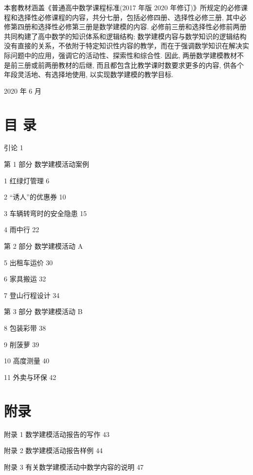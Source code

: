 \documentclass[10pt]{article}
\begin{document}
本套教材涵盖《普通高中数学课程标准(2017 年版 2020 年修订)》所规定的必修课程和选择性必修课程的内容，共分七册，包括必修四册、选择性必修三册, 其中必修第四册和选择性必修第三册是数学建模的内容. 必修前三册和选择性必修前两册共同构建了高中数学的知识体系和逻辑结构; 数学建模内容与数学知识的逻辑结构没有直接的关系，不依附于特定知识性内容的教学，而在于强调数学知识在解决实际问题中的应用，强调它的活动性、探索性和综合性. 因此, 两册数学建模教材不是前三册或前两册教材的后继, 而且都包含比教学课时数要求更多的内容, 供各个年段灵活地、有选择地使用, 以实现数学建模的教学目标.

2020 年 6 月

\section*{}

\section*{目 录}

引论 1

第 1 部分 数学建模活动案例

1 红绿灯管理 6

2 “诱人”的优惠券 10

3 车辆转弯时的安全隐患 15

4 雨中行 22

第 2 部分 数学建模活动 A

5 出租车运价 30

6 家具搬运 32

7 登山行程设计 34

第 3 部分 数学建模活动 B

8 包装彩带 38

9 削菠萝 39

10 高度测量 40

11 外卖与环保 42

\section*{附录}

附录 1 数学建模活动报告的写作 43

附录 2 数学建模活动报告样例 44

附录 3 有关数学建模活动中数学内容的说明 47



\section*{}
\end{document}
